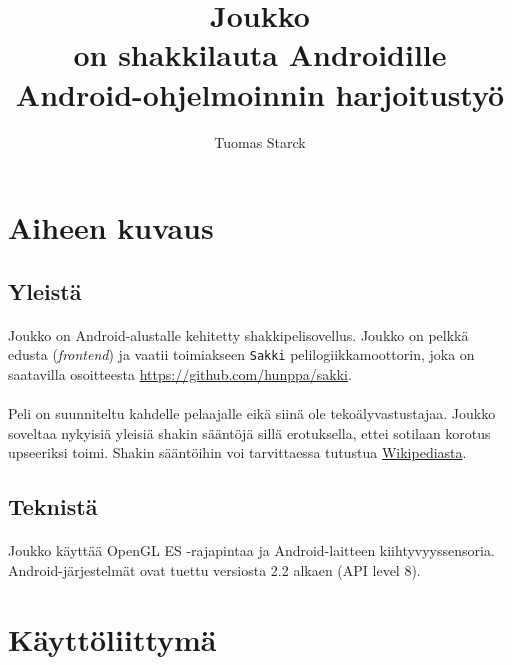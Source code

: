 \documentclass[11pt]{article}
\begin{document}
\title{
\Huge{\bf Joukko} \\
\Large{on shakkilauta Androidille} \\
\large{Android-ohjelmoinnin harjoitustyö}}
\author{Tuomas Starck}
\maketitle

\vspace{4em}

\section{Aiheen kuvaus}
\label{sec:aihe}

\subsection{Yleistä}

\paragraph{} Joukko on Android-alustalle kehitetty shakkipelisovellus. Joukko on pelkkä edusta (\textit{frontend}) ja vaatii toimiakseen \texttt{Sakki} pelilogiikkamoottorin, joka on saatavilla osoitteesta \url{https://github.com/hunppa/sakki}.

\paragraph{} Peli on suunniteltu kahdelle pelaajalle eikä siinä ole tekoälyvastustajaa. Joukko soveltaa nykyisiä yleisiä shakin sääntöjä sillä erotuksella, ettei sotilaan korotus upseeriksi toimi. Shakin sääntöihin voi tarvittaessa tutustua \href{http://fi.wikipedia.org/wiki/Shakki}{Wikipediasta}.

\subsection{Teknistä}

\paragraph{} Joukko käyttää OpenGL ES -rajapintaa ja Android-laitteen kiihtyvyyssensoria. Android-järjestelmät ovat tuettu versiosta 2.2 alkaen (API level 8).

\section{Käyttöliittymä}
\end{document}
